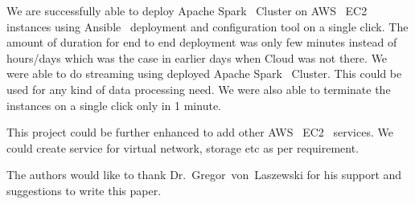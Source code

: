We are successfully able to deploy Apache Spark~\cite{hid-sp18-511-www-spark} Cluster on AWS~\cite{hid-sp18-511-www-aws} EC2~\cite{hid-sp18-511-www-ec2} instances using Ansible~\cite{hid-sp18-511-www-ansible} deployment and configuration tool on a single click. The amount of duration for end to end deployment was only few minutes instead of hours/days which was the case in earlier days when Cloud was not there. We were able to do  streaming using deployed Apache Spark~\cite{hid-sp18-511-www-spark} Cluster. This could be used for any kind of data processing need. We were also able to terminate the instances on a single click only in 1 minute.

This project could be further enhanced to add other AWS~\cite{hid-sp18-511-www-aws} EC2~\cite{hid-sp18-511-www-ec2} services. We could create service for virtual network, storage etc as per requirement.

\begin{acks}

  The authors would like to thank Dr.~Gregor~von~Laszewski for his
  support and suggestions to write this paper.

\end{acks}


 

